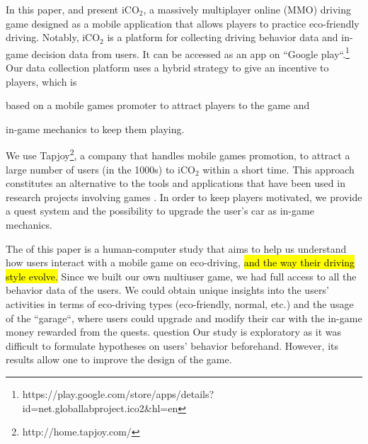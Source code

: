 \documentclass[preprint,authoryear,12pt]{elsarticle}
\newcommand{\hlc}[2][yellow]{ {\sethlcolor{#1} \hl{#2}} }
\newcommand{\question}[1] {} %
\newcommand{\commentShow}[1] {} %
\begin{document}
In this paper, \question{we broadly adhere to these steps} and present iCO$_2$, a massively multiplayer online (MMO) driving game designed as a mobile application that allows players to practice eco-friendly driving. Notably, iCO$_2$ is a platform for collecting driving behavior data and in-game decision data from users. It can be accessed as an app on ``Google play``.\footnote{https://play.google.com/store/apps/details?id=net.globallabproject.ico2\&hl=en}
Our data collection platform uses a hybrid strategy to give an incentive to players, which is \begin{inparaenum} \item based on a mobile games promoter to attract players to the game and \item in-game mechanics to keep them playing. \end{inparaenum} We use Tapjoy\footnote{http://home.tapjoy.com/}, %
a company that handles mobile games promotion, to attract a large number of users (in the 1000s) to iCO$_2$ within a short time. This approach constitutes an alternative to the tools and applications that have been used in research projects involving games \citep{kittur2008crowdsourcing,Biewald:2012,ChanH12}.
In order to keep players motivated, we provide a quest system and the possibility to upgrade the user's car as in-game mechanics.

The \question{main contribution} of this paper is a human-computer study that aims to help us understand how users interact with a mobile game on eco-driving, 
\hlc[green]{and the way their driving style evolve.} 
Since we built our own multiuser game, we had full access to all the behavior data of the users. We could obtain unique insights into the users' activities in terms of eco-driving types (eco-friendly, normal, etc.) and the usage of the ``garage``, where users could upgrade and modify their car with the in-game money rewarded from the quests. \commentShow{The definition of quest is not given before this. } question {Our study is exploratory as it was difficult to formulate hypotheses on users' behavior beforehand. } However, its results allow one to improve the design of the game. \commentShow{How the results have improved the in-game design ? There is discussion of that. }

\end{document}
